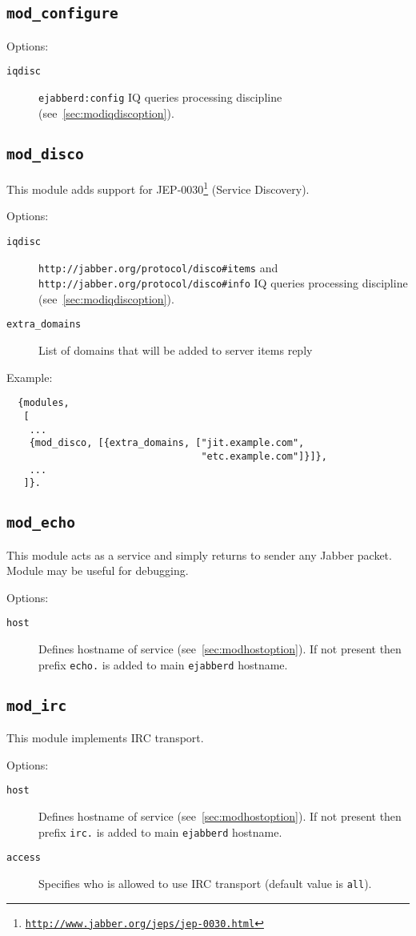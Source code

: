 \documentclass[a4paper,10pt]{article}
\newcommand{\bracehack}{\def\{{\char"7B}\def\}{\char"7D}}
\newcommand{\ns}[1]{\texttt{#1}}
\newcommand{\jid}[1]{\texttt{#1}}
\newcommand{\term}[1]{\texttt{#1}}
\newcommand{\ejabberd}{\texttt{ejabberd}}
\newcommand{\Jabber}{Jabber}
\newcommand{\module}[1]{\texttt{#1}}
\newcommand{\modconfigure}{\module{mod\_configure}}
\newcommand{\moddisco}{\module{mod\_disco}}
\newcommand{\modirc}{\module{mod\_irc}}
\newcommand{\modecho}{\module{mod\_echo}}
\newcommand{\titem}[1]{\item[\bracehack\texttt{#1}]}
\gdef\footahref#1#2{#2\footnote{\href{#1}{\texttt{#1}}}}
\newcommand{\tjepref}[2]{\footahref{http://www.jabber.org/jeps/jep-#1.html}{#2}}
\newcommand{\jepref}[1]{\tjepref{#1}{JEP-#1}}
\newcommand{\iqdiscitem}[1]{\titem{iqdisc} #1 IQ queries processing
discipline (see~\ref{sec:modiqdiscoption}).}
\newcommand{\hostitem}[1]{\titem{host} Defines hostname of service
(see~\ref{sec:modhostoption}). If not present
then prefix \jid{#1.} is added to main \ejabberd{} hostname.}
\begin{document}
\subsection{\modconfigure{}}
\label{sec:modconfigure}

Options:
\begin{description}
\iqdiscitem{\ns{ejabberd:config}}
\end{description}


\subsection{\moddisco{}}
\label{sec:moddisco}

This module adds support for \jepref{0030} (Service Discovery).

Options:
\begin{description}
\iqdiscitem{\ns{http://jabber.org/protocol/disco\#items} and
  \ns{http://jabber.org/protocol/disco\#info}}
\titem{extra\_domains} List of domains that will be added to server
  items reply
\end{description}

Example:
\begin{verbatim}
  {modules,
   [
    ...
    {mod_disco, [{extra_domains, ["jit.example.com",
                                  "etc.example.com"]}]},
    ...
   ]}.
\end{verbatim}


\subsection{\modecho{}}
\label{sec:modecho}

This module acts as a service and simply returns to sender any \Jabber{} packet. Module may be
useful for debugging.

Options:
\begin{description}
\hostitem{echo}
\end{description}


\subsection{\modirc{}}
\label{sec:modirc}

This module implements IRC transport.

Options:
\begin{description}
\hostitem{irc}
\titem{access} Specifies who is allowed to use IRC transport (default value is \term{all}).
\end{description}
\end{document}
